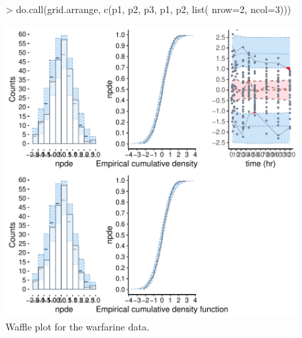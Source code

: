 \documentclass{article}
\begin{document}
\begin{figure}[!h]
\begin{center}
\begin{Schunk}
\begin{Sinput}
> do.call(grid.arrange, c(p1, p2, p3, p1, p2, list( nrow=2, ncol=3)))
\end{Sinput}
\end{Schunk}
\includegraphics{demoGraphs-013}
\end{center}
\par \kern -0.5cm
\caption{Waffle plot for the warfarine data.} \label{fig:waffleWarfarine}
\end{figure}
\end{document}
